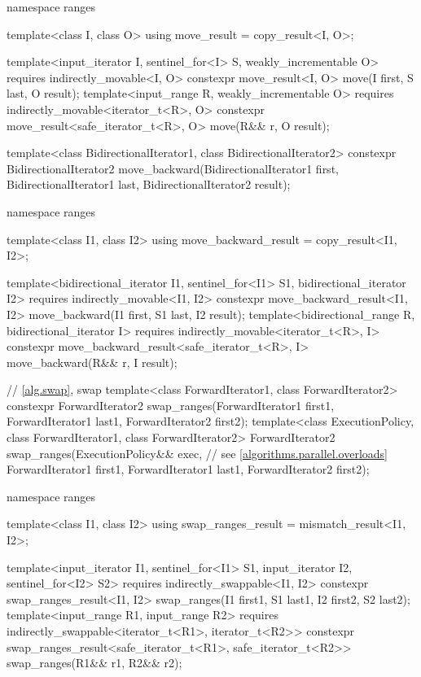 \begin{codeblock}
{  namespace ranges {
    template<class I, class O>
    using move_result = copy_result<I, O>;

    template<input_iterator I, sentinel_for<I> S, weakly_incrementable O>
      requires indirectly_movable<I, O>
      constexpr move_result<I, O>
        move(I first, S last, O result);
    template<input_range R, weakly_incrementable O>
      requires indirectly_movable<iterator_t<R>, O>
      constexpr move_result<safe_iterator_t<R>, O>
        move(R&& r, O result);
  }

  template<class BidirectionalIterator1, class BidirectionalIterator2>
    constexpr BidirectionalIterator2
      move_backward(BidirectionalIterator1 first, BidirectionalIterator1 last,
                    BidirectionalIterator2 result);

  namespace ranges {
    template<class I1, class I2>
    using move_backward_result = copy_result<I1, I2>;

    template<bidirectional_iterator I1, sentinel_for<I1> S1, bidirectional_iterator I2>
      requires indirectly_movable<I1, I2>
      constexpr move_backward_result<I1, I2>
        move_backward(I1 first, S1 last, I2 result);
    template<bidirectional_range R, bidirectional_iterator I>
      requires indirectly_movable<iterator_t<R>, I>
      constexpr move_backward_result<safe_iterator_t<R>, I>
        move_backward(R&& r, I result);
  }

  // \ref{alg.swap}, swap
  template<class ForwardIterator1, class ForwardIterator2>
    constexpr ForwardIterator2 swap_ranges(ForwardIterator1 first1, ForwardIterator1 last1,
                                           ForwardIterator2 first2);
  template<class ExecutionPolicy, class ForwardIterator1, class ForwardIterator2>
    ForwardIterator2 swap_ranges(ExecutionPolicy&& exec,        // see \ref{algorithms.parallel.overloads}
                                 ForwardIterator1 first1, ForwardIterator1 last1,
                                 ForwardIterator2 first2);

  namespace ranges {
    template<class I1, class I2>
    using swap_ranges_result = mismatch_result<I1, I2>;

    template<input_iterator I1, sentinel_for<I1> S1, input_iterator I2, sentinel_for<I2> S2>
      requires indirectly_swappable<I1, I2>
      constexpr swap_ranges_result<I1, I2>
        swap_ranges(I1 first1, S1 last1, I2 first2, S2 last2);
    template<input_range R1, input_range R2>
      requires indirectly_swappable<iterator_t<R1>, iterator_t<R2>>
      constexpr swap_ranges_result<safe_iterator_t<R1>, safe_iterator_t<R2>>
        swap_ranges(R1&& r1, R2&& r2);
  }

}
\end{codeblock}
